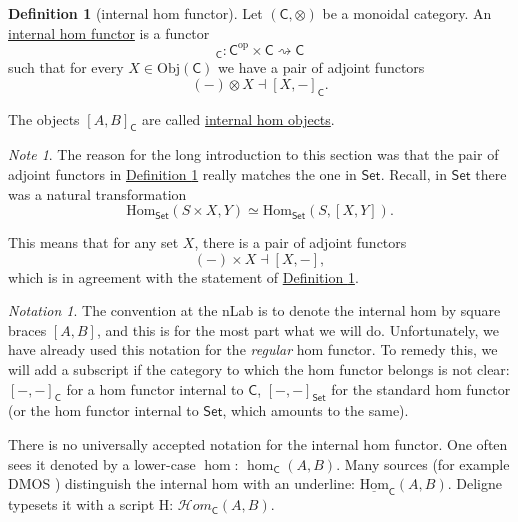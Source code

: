 \documentclass[a4paper,10pt]{scrreprt}
\newcommand{\defn}[1]{\ul{#1}}
\newcommand{\Obj}{\mathrm{Obj}}
\newcommand{\Hom}{\mathrm{Hom}}
\theoremstyle{definition}
\newtheorem{definition}{Definition}[section]
\theoremstyle{plain}
\theoremstyle{remark}
\newtheorem{note}{Note}[section]
\newtheorem{notation}{Notation}[section]
\begin{document}
\begin{definition}[internal hom functor]
  \label{def:internalhomfunctor}
  Let $(\mathsf{C}, \otimes)$ be a monoidal category. An \defn{internal hom functor} is a functor
  \begin{equation*}
    [-, -]_{\mathsf{C}}\colon \mathsf{C}^{\mathrm{op}} \times \mathsf{C} \rightsquigarrow \mathsf{C}
  \end{equation*}
  such that for every $X \in \Obj(\mathsf{C})$ we have a pair of adjoint functors
  \begin{equation*}
    (-) \otimes X \dashv [X, -]_{\mathsf{C}}.
  \end{equation*}

  The objects $[A, B]_{\mathsf{C}}$ are called \defn{internal hom objects}.
\end{definition}

\begin{note}
  The reason for the long introduction to this section was that the pair of adjoint functors in \hyperref[def:internalhomfunctor]{Definition \ref*{def:internalhomfunctor}} really matches the one in $\mathsf{Set}$. Recall, in $\mathsf{Set}$ there was a natural transformation
  \begin{equation*}
    \Hom_{\mathsf{Set}}(S \times X, Y) \simeq \Hom_{\mathsf{Set}}(S, [X, Y]).
  \end{equation*}

  This means that for any set $X$, there is a pair of adjoint functors 
  \begin{equation*}
    (-) \times X \dashv [X, -],
  \end{equation*}
  which is in agreement with the statement of \hyperref[def:internalhomfunctor]{Definition \ref*{def:internalhomfunctor}}.
\end{note}

\begin{notation}
  The convention at the nLab is to denote the internal hom by square braces $[A,B]$, and this is for the most part what we will do. Unfortunately, we have already used this notation for the \emph{regular} hom functor. To remedy this, we will add a subscript if the category to which the hom functor belongs is not clear: $[-,-]_{\mathsf{C}}$ for a hom functor internal to $\mathsf{C}$, $[-,-]_{\mathsf{Set}}$ for the standard hom functor (or the hom functor internal to $\mathsf{Set}$, which amounts to the same). 

  There is no universally accepted notation for the internal hom functor. One often sees it denoted by a lower-case $\hom$: $\hom_{\mathsf{C}}(A, B)$. Many sources (for example DMOS \cite{DMOS}) distinguish the internal hom with an underline: $\underline{\Hom}_{\mathsf{C}}(A, B)$. Deligne typesets it with a script H: $\mathscr{H}om_{\mathsf{C}}(A, B)$.
\end{notation}
\end{document}
